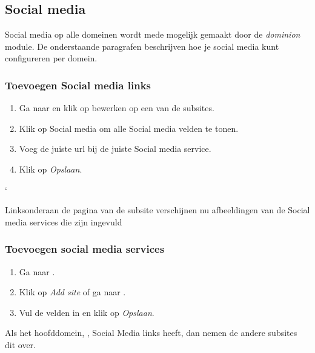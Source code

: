 \subsection{Social media}\label{socialmedia}
Social media op alle domeinen wordt mede mogelijk gemaakt door de \emph{dominion} module. 
De onderstaande paragrafen beschrijven hoe je social media kunt configureren per domein. 

\subsubsection{Toevoegen Social media links}

\begin{enumerate}
\item Ga naar   en klik op bewerken op een van de subsites.
\item Klik op Social media om alle Social media velden te tonen.
\item Voeg de juiste url bij de juiste Social media service.
\item Klik op \emph{Opslaan}.
\end{enumerate}`

Linksonderaan de pagina van de subsite verschijnen nu afbeeldingen van de Social media services die zijn ingevuld

\subsubsection{Toevoegen social media services}

\begin{enumerate}
\item Ga naar  .
\item Klik op \emph{Add site} of ga naar .
\item Vul de velden in en klik op \emph{Opslaan}.
\end{enumerate}

Als het hoofddomein, \drupalpath, Social Media links heeft, dan nemen de andere subsites dit over.
